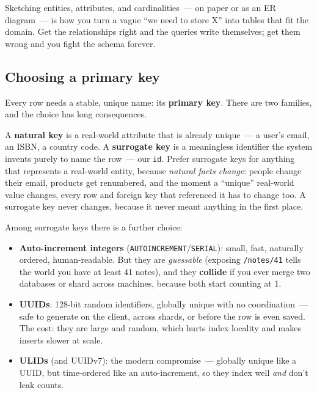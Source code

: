 \noindent{}Sketching entities, attributes, and cardinalities~--- on paper or as an ER diagram~--- is how you turn a vague ``we need to store X'' into tables that fit the domain. Get the relationships right and the queries write themselves; get them wrong and you fight the schema forever.

\subsection*{Choosing a primary key}\label{06-local-dependencies:choosing-a-primary-key}

Every row needs a stable, unique name: its \textbf{primary key}. There are two families, and the choice has long consequences.

A \textbf{natural key} is a real-world attribute that is already unique~--- a user's email, an ISBN, a country code. A \textbf{surrogate key} is a meaningless identifier the system invents purely to name the row~--- our \texttt{id}. Prefer surrogate keys for anything that represents a real-world entity, because \emph{natural facts change}: people change their email, products get renumbered, and the moment a ``unique'' real-world value changes, every row and foreign key that referenced it has to change too. A surrogate key never changes, because it never meant anything in the first place.

Among surrogate keys there is a further choice:

\begin{itemize}
\tightlist
\item
  \textbf{Auto-increment integers} (\texttt{AUTOINCREMENT}/\texttt{SERIAL}): small, fast, naturally ordered, human-readable. But they are \emph{guessable} (exposing \texttt{/notes/41} tells the world you have at least 41 notes), and they \textbf{collide} if you ever merge two databases or shard across machines, because both start counting at 1.
\item
  \textbf{UUIDs}: 128-bit random identifiers, globally unique with no coordination~--- safe to generate on the client, across shards, or before the row is even saved. The cost: they are large and random, which hurts index locality and makes inserts slower at scale.
\item
  \textbf{ULIDs} (and UUIDv7): the modern compromise~--- globally unique like a UUID, but time-ordered like an auto-increment, so they index well \emph{and} don't leak counts.
\end{itemize}

